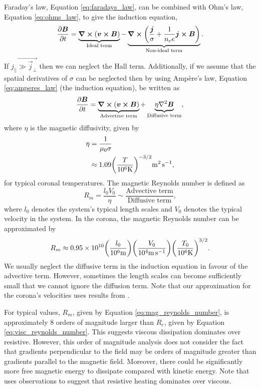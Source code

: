Faraday's law, Equation \eqref{eq:faradays_law}, can be combined with Ohm's law, Equation \eqref{eq:ohms_law}, to give the induction equation,
\begin{equation}
    \label{eq:induction_equation}
    \pdv{\boldsymbol{B}}{t}=\underbrace{\curl(\boldsymbol{v}\cross\boldsymbol{B})}_{\text{Ideal term}}-\underbrace{\curl(\frac{\boldsymbol{j}}{\sigma}+\frac{1}{n_ee}\boldsymbol{j}\cross\boldsymbol{B})}_{\text{Non-ideal term}}.
\end{equation}
If $\vec{j_{||}\gg\vec{j}_\perp}$ then we can neglect the Hall term. Additionally, if we assume that the spatial derivatives of $\sigma$ can be neglected then by using Amp\`ere's law, Equation \eqref{eq:amperes_law} (the induction equation), be written as
\begin{equation}
    \pdv{\vec{B}}{t}=\underbrace{\curl(\vec{v}\cross\vec{B})}_{\text{Advective term}}+\underbrace{\eta\laplacian\vec{B}}_{\text{Diffusive term}},
\end{equation}
where $\eta$ is the magnetic diffusivity, given by
\begin{equation}
    \label{eq:eta_typical_values}
    \begin{aligned}
        \eta&=\frac{1}{\mu_0\sigma} \\
        &\approx 1.09\qty(\frac{T}{10^6\si{.K}})^{-3/2}\si{.m^2.s^{-1}},
    \end{aligned}
\end{equation}
for typical coronal temperatures. The magnetic Reynolds number is defined as
\begin{equation}
    R_m=\frac{l_0V_0}{\eta}\sim\frac{\text{Advective term}}{\text{Diffusive term}},
\end{equation}
where $l_0$ denotes the system's typical length scales and $V_0$ denotes the typical velocity in the system. In the corona, the magnetic Reynolds number can be approximated by
\begin{equation}
    \label{eq:mag_reynolds_number}
    R_m\approx0.95\times10^{10}\qty(\frac{l_0}{10^6\si{.m}})\qty(\frac{V_0}{10^4\si{.m.s^{-1}}})\qty(\frac{T_0}{10^6\si{.K}})^{3/2}.
\end{equation}
We usually neglect the diffusive term in the induction equation in favour of the advective term. However, sometimes the length scales can become sufficiently small that we cannot ignore the diffusion term. Note that our approximation for the corona's velocities uses results from \citet{McIntosh2011,McIntosh2012}.

For typical values, $R_m$, given by Equation \eqref{eq:mag_reynolds_number}, is approximately 8 orders of magnitude larger than $R_e$, given by Equation \eqref{eq:visc_reynolds_number}. This suggests viscous dissipation dominates over resistive. However, this order of magnitude analysis does not consider the fact that gradients perpendicular to the field may be orders of magnitude greater than gradients parallel to the magnetic field. Moreover, there could be significantly more free magnetic energy to dissipate compared with kinetic energy. Note that \citet{vanDoorsselaere2007} uses observations to suggest that resistive heating dominates over viscous.

